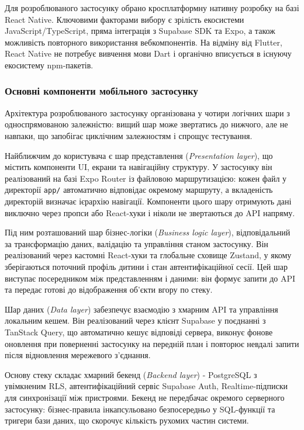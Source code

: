 Для розроблюваного застосунку обрано кросплатформну нативну розробку на базі React Native. Ключовими факторами вибору є зрілість екосистеми JavaScript/TypeScript, пряма інтеграція з Supabase \gls{SDK} та Expo, а також можливість повторного використання вебкомпонентів. На відміну від Flutter, React Native не потребує вивчення мови Dart і органічно вписується в існуючу екосистему npm-пакетів.

\subsubsection{Основні компоненти мобільного застосунку}

Архітектура розроблюваного застосунку організована у чотири логічних шари з односпрямованою залежністю: вищий шар може звертатись до нижчого, але не навпаки, що запобігає циклічним залежностям і спрощує тестування.

Найближчим до користувача є шар представлення (\textit{Presentation layer}), що містить компоненти \gls{UI}, екрани та навігаційну структуру. У застосунку він реалізований на базі Expo Router із файловою маршрутизацією: кожен файл у директорії \texttt{app/} автоматично відповідає окремому маршруту, а вкладеність директорій визначає ієрархію навігації. Компоненти цього шару отримують дані виключно через пропси або React-хуки і ніколи не звертаються до \gls{API} напряму.

Під ним розташований шар бізнес-логіки (\textit{Business logic layer}), відповідальний за трансформацію даних, валідацію та управління станом застосунку. Він реалізований через кастомні React-хуки та глобальне сховище Zustand, у якому зберігаються поточний профіль дитини і стан автентифікаційної сесії. Цей шар виступає посередником між представленням і даними: він формує запити до \gls{API} та передає готові до відображення об'єкти вгору по стеку.

Шар даних (\textit{Data layer}) забезпечує взаємодію з хмарним \gls{API} та управління локальним кешем. Він реалізований через клієнт Supabase у поєднанні з TanStack Query, що автоматично кешує відповіді сервера, виконує фонове оновлення при поверненні застосунку на передній план і повторює невдалі запити після відновлення мережевого з'єднання.

Основу стеку складає хмарний бекенд (\textit{Backend layer}) - PostgreSQL з увімкненим \gls{RLS}, автентифікаційний сервіс Supabase Auth, Realtime-підписки для синхронізації між пристроями. Бекенд не передбачає окремого серверного застосунку: бізнес-правила інкапсульовано безпосередньо у \gls{SQL}-функції та тригери бази даних, що скорочує кількість рухомих частин системи.

